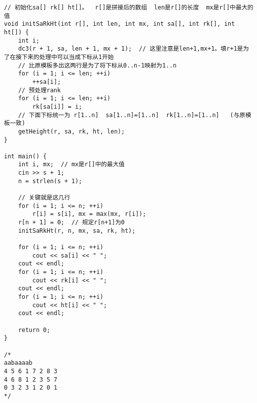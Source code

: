 \begin{lstlisting}
// 初始化sa[] rk[] ht[]。  r[]是拼接后的数组  len是r[]的长度  mx是r[]中最大的值
void initSaRkHt(int r[], int len, int mx, int sa[], int rk[], int ht[]) {
    int i;
    dc3(r + 1, sa, len + 1, mx + 1);  // 这里注意是len+1,mx+1。填r+1是为了在接下来的处理中可以当成下标从1开始
    // 比原模板多出这两行是为了将下标从0..n-1映射为1..n
    for (i = 1; i <= len; ++i)
        ++sa[i];
    // 预处理rank
    for (i = 1; i <= len; ++i)
        rk[sa[i]] = i;
    // 下面下标统一为 r[1..n]  sa[1..n]=[1..n]  rk[1..n]=[1..n]   (与原模板一致)
    getHeight(r, sa, rk, ht, len);
}

int main() {
    int i, mx;  // mx是r[]中的最大值
    cin >> s + 1;
    n = strlen(s + 1);

    // 关键就是这几行
    for (i = 1; i <= n; ++i)
        r[i] = s[i], mx = max(mx, r[i]);
    r[n + 1] = 0;  // 规定r[n+1]为0
    initSaRkHt(r, n, mx, sa, rk, ht);

    for (i = 1; i <= n; ++i)
        cout << sa[i] << " ";
    cout << endl;
    for (i = 1; i <= n; ++i)
        cout << rk[i] << " ";
    cout << endl;
    for (i = 1; i <= n; ++i)
        cout << ht[i] << " ";
    cout << endl;

    return 0;
}

/*
aabaaaab
4 5 6 1 7 2 8 3
4 6 8 1 2 3 5 7
0 3 2 3 1 2 0 1
*/
\end{lstlisting}
